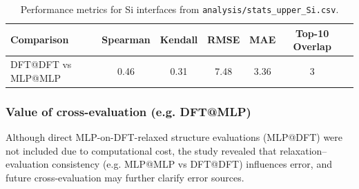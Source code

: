 \begin{table}[h]
    \centering
    \caption{Performance metrics for Si interfaces from \texttt{analysis/stats_upper_Si.csv}.}
    \begin{tabular}{lcccccc}
        Comparison & Spearman & Kendall & RMSE & MAE & Top-10 Overlap \\
        \hline
        DFT@DFT vs MLP@MLP & 0.46 & 0.31 & 7.48 & 3.36 & 3 \\
    \end{tabular}
\end{table}

\subsubsection{Value of cross-evaluation (e.g. DFT@MLP)}

Although direct MLP-on-DFT-relaxed structure evaluations (MLP@DFT) were not included due to computational cost, the study revealed that relaxation--evaluation consistency (e.g. MLP@MLP vs DFT@DFT) influences error, and future cross-evaluation may further clarify error sources.

